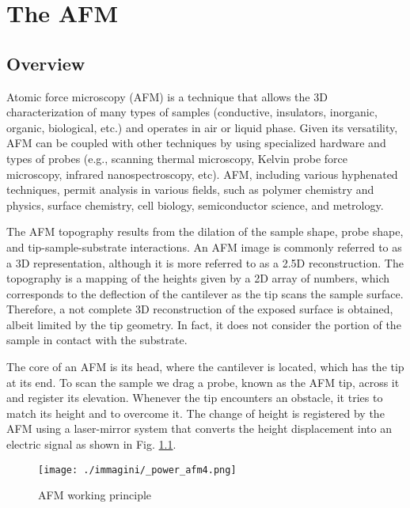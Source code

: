 \chapter{The AFM}

\section{Overview}

Atomic force microscopy (AFM) is a technique that allows the 3D characterization of many types of samples (conductive, insulators, inorganic, organic, biological, etc.) and operates in air or liquid phase. Given its versatility, AFM can be coupled with other techniques by using specialized hardware and types of probes (e.g., scanning thermal microscopy, Kelvin probe force microscopy, infrared nanospectroscopy, etc). AFM, including various hyphenated techniques, permit analysis in various fields, such as polymer chemistry and physics, surface chemistry, cell biology, semiconductor science, and metrology.

The AFM topography results from the dilation of the sample shape, probe shape, and tip-sample-substrate interactions. An AFM image is commonly referred to as a 3D representation, although it is more referred to as a 2.5D reconstruction. The topography is a mapping of the heights given by a 2D array of numbers, which corresponds to the deflection of the cantilever as the tip scans the sample surface. Therefore, a not complete 3D reconstruction of the exposed surface is obtained, albeit limited by the tip geometry. In fact, it does not consider the portion of the sample in contact with the substrate. \cite{ribotta3}

The core of an AFM is its head, where the cantilever is located, which has the tip at its end. To scan the sample we drag a probe, known as the AFM tip, across it and register its elevation. Whenever the tip encounters an obstacle, it tries to match its height and to overcome it. The change of height is registered by the AFM using a laser-mirror system that converts the height displacement into an electric signal as shown in Fig. \ref{fig:AFM}.

\newpage

\begin{figure}[h]
    \centering
    \texttt{[image: ./immagini/\_power\_afm4.png]}
    \caption{AFM working principle}
    \label{fig:AFM}
\end{figure}

